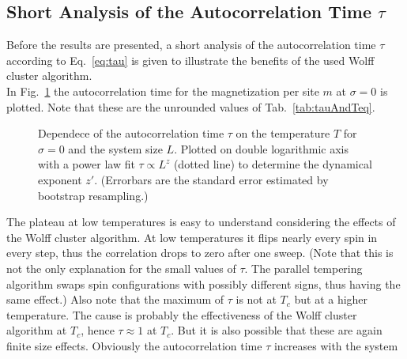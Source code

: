 \subsection{Short Analysis of the Autocorrelation Time  $\tau$}
\label{ssec:results:autocorr}
    Before the results are presented, a short analysis of the
    autocorrelation time \(\tau\) according to Eq.\ \ref{eq:tau} is given to
    illustrate the benefits of the used Wolff cluster algorithm.\\
    In Fig.\ \ref{fig:autocorr}
    the autocorrelation time for the magnetization per site \(m\) at
    \(\sigma=0\) is plotted. Note that these are the unrounded values
    of Tab.\ \ref{tab:tauAndTeq}.
    \begin{figure}[htbp]
        \centering
        \caption[The Autocorrelation Time $\tau$]
        {
            Dependece of the autocorrelation time $\tau$ on
             the temperature $T$ for
                $\sigma=0$ and
             the system size $L$. Plotted on
                double logarithmic axis with a power law fit \(\tau \propto L^z\) (dotted line)
                to determine the dynamical exponent \(z'\).
                (Errorbars are the standard error estimated by bootstrap resampling.)
        }
        \label{fig:autocorr}
    \end{figure}
    The plateau at low temperatures is easy to understand considering the
    effects of the Wolff cluster algorithm. At low temperatures it flips nearly every
    spin in every step, thus the correlation drops to zero after one sweep.
    (Note that this is not the only explanation for the small values of \(\tau\).
    The parallel tempering algorithm swaps spin configurations
    with possibly different signs, thus having the same effect.)
    Also note that the maximum of \(\tau\) is not at \(T_c\) but at a higher
    temperature. The cause is probably the effectiveness of the Wolff cluster
    algorithm at \(T_c\), hence \(\tau \approx 1\) at \(T_{c}\).
    But it is also possible that these are again finite size effects.
    Obviously the autocorrelation time \(\tau\) increases with the system
